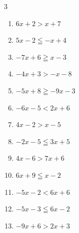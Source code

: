 \begin{multicols}{3}
\begin{enumerate}
        \phantom{$\displaystyle x\leqq -14$}

  \item $6x+2>x+7$

        \phantom{$\displaystyle x>1$}

  \item $5x-2\leqq -x+4$

        \phantom{$\displaystyle x\leqq 1$}

\columnbreak %

  \item $-7x+6\geqq x-3$


  \item $-4x+3>-x-8$


  \item $-5x+8\geqq -9x-3$


  \item $-6x-5<2x+6$


  \item $4x-2>x-5$

        \phantom{$\displaystyle x>-1$}

  \item $-2x-5\leqq 3x+5$

        \phantom{$\displaystyle x\geqq -2$}

  \item $4x-6>7x+6$

        \phantom{$\displaystyle x<-4$}

  \item $6x+9\leqq x-2$


  \item $-5x-2<6x+6$


  \item $-5x-3\leqq 6x-2$


  \item $-9x+6>2x+3$



\end{enumerate}
\end{multicols}
